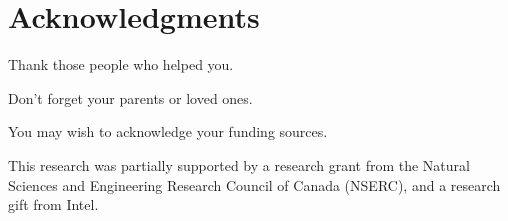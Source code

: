 
\chapter{Acknowledgments}

Thank those people who helped you. 

Don't forget your parents or loved ones.

You may wish to acknowledge your funding sources.

 This research was partially supported by a research grant from the Natural Sciences and Engineering Research Council of Canada (NSERC), and a research gift from Intel.
